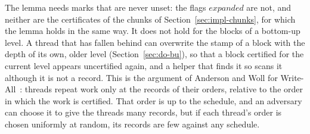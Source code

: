 The lemma needs marks that are never unset: the flags $\mathit{expanded}$ are not, and neither are the certificates of the chunks of Section~\ref{sec:impl-chunks}, for which the lemma holds in the same way. It does not hold for the blocks of a bottom-up level. A thread that has fallen behind can overwrite the stamp of a block with the depth of its own, older level (Section~\ref{sec:do-bu}), so that a block certified for the current level appears uncertified again, and a helper that finds it so scans it although it is not a record. This is the argument of Anderson and Woll for Write-All~\cite{anderson_woll_cwa}: threads repeat work only at the records of their orders, relative to the order in which the work is certified. That order is up to the schedule, and an adversary can choose it to give the threads many records, but if each thread's order is chosen uniformly at random, its records are few against any schedule.

